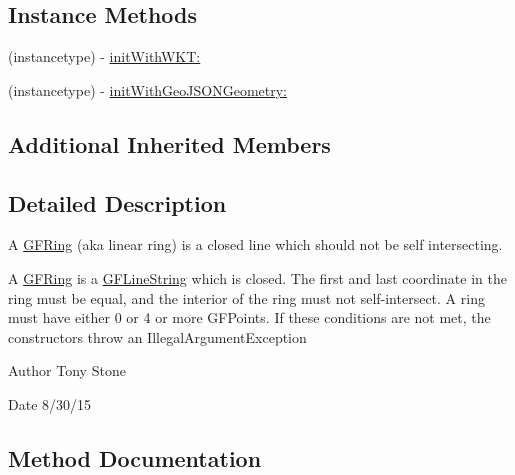 \subsection*{Instance Methods}
\begin{DoxyCompactItemize}
\item 
(instancetype) -\/ \hyperlink{interface_g_f_ring_a063be826fc24346e1fb5d4830f641ef0}{init\+With\+W\+K\+T\+:}
\item 
(instancetype) -\/ \hyperlink{interface_g_f_ring_a3562a7a5b8b37c53de97a0c31981c907}{init\+With\+Geo\+J\+S\+O\+N\+Geometry\+:}
\end{DoxyCompactItemize}
\subsection*{Additional Inherited Members}


\subsection{Detailed Description}
A \hyperlink{interface_g_f_ring}{G\+F\+Ring} (aka linear ring) is a closed line which should not be self intersecting. 

A \hyperlink{interface_g_f_ring}{G\+F\+Ring} is a \hyperlink{interface_g_f_line_string}{G\+F\+Line\+String} which is closed. The first and last coordinate in the ring must be equal, and the interior of the ring must not self-\/intersect. A ring must have either 0 or 4 or more G\+F\+Points. If these conditions are not met, the constructors throw an Illegal\+Argument\+Exception

\begin{DoxyAuthor}{Author}
Tony Stone 
\end{DoxyAuthor}
\begin{DoxyDate}{Date}
8/30/15 
\end{DoxyDate}


\subsection{Method Documentation}
\hypertarget{interface_g_f_ring_a063be826fc24346e1fb5d4830f641ef0}{}

